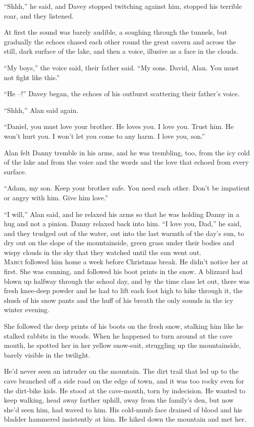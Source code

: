 ``Shhh,'' he said, and Davey stopped twitching against him, stopped
his terrible roar, and they listened.

At first the sound was barely audible, a soughing through the tunnels,
but gradually the echoes chased each other round the great cavern and
across the still, dark surface of the lake, and then a voice, illusive
as a face in the clouds.

``My boys,'' the voice said, their father said.  ``My sons.  David,
Alan.  You must not fight like this.''

``He --!'' Davey began, the echoes of his outburst scattering their
father's voice.

``Shhh,'' Alan said again.

``Daniel, you must love your brother.  He loves you.  I love you. 
Trust him.  He won't hurt you.  I won't let you come to any harm.  I
love you, son.''

Alan felt Danny tremble in his arms, and he was trembling, too, from
the icy cold of the lake and from the voice and the words and the love
that echoed from every surface.

``Adam, my son.  Keep your brother safe.  You need each other.  Don't
be impatient or angry with him.  Give him love.''

``I will,'' Alan said, and he relaxed his arms so that he was holding
Danny in a hug and not a pinion.  Danny relaxed back into him.  ``I
love you, Dad,'' he said, and they trudged out of the water, out into
the last warmth of the day's sun, to dry out on the slope of the
mountainside, green grass under their bodies and wispy clouds in the
sky that they watched until the sun went out.
\\
\lettrine[lines=3, lhang=.5, nindent=0pt, findent=2pt]{M}{arci} followed him home a week before Christmas break.  He didn't
notice her at first.  She was cunning, and followed his boot prints in
the snow.  A blizzard had blown up halfway through the school day, and
by the time class let out, there was fresh knee-deep powder and he had
to lift each foot high to hike through it, the shush of his snow pants
and the huff of his breath the only sounds in the icy winter evening.

She followed the deep prints of his boots on the fresh snow, stalking
him like he stalked rabbits in the woods.  When he happened to turn
around at the cave mouth, he spotted her in her yellow snow-suit,
struggling up the mountainside, barely visible in the twilight.

He'd never seen an intruder on the mountain.  The dirt trail that led
up to the cave branched off a side road on the edge of town, and it
was too rocky even for the dirt-bike kids.  He stood at the
cave-mouth, torn by indecision.  He wanted to keep walking, head away
farther uphill, away from the family's den, but now she'd seen him,
had waved to him.  His cold-numb face drained of blood and his bladder
hammered insistently at him.  He hiked down the mountain and met her.

